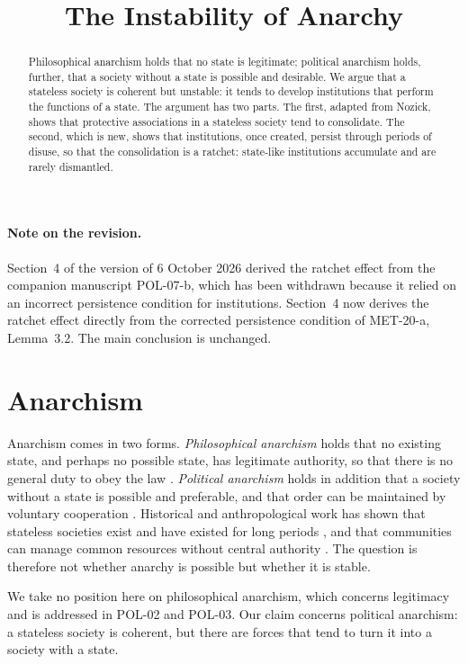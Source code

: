\documentclass{situationist-preprint}
\title{The Instability of Anarchy}
\begin{document}
\maketitle

\begin{abstract}
Philosophical anarchism holds that no state is legitimate; political anarchism holds, further, that a society without a state is possible and desirable. We argue that a stateless society is coherent but unstable: it tends to develop institutions that perform the functions of a state. The argument has two parts. The first, adapted from Nozick, shows that protective associations in a stateless society tend to consolidate. The second, which is new, shows that institutions, once created, persist through periods of disuse, so that the consolidation is a ratchet: state-like institutions accumulate and are rarely dismantled.
\end{abstract}

\paragraph{Note on the revision.} Section~4 of the version of 6 October 2026 derived the ratchet effect from the companion manuscript POL-07-b, which has been withdrawn because it relied on an incorrect persistence condition for institutions. Section~4 now derives the ratchet effect directly from the corrected persistence condition of MET-20-a, Lemma~3.2. The main conclusion is unchanged.

\section{Anarchism}

Anarchism comes in two forms. \emph{Philosophical anarchism} holds that no existing state, and perhaps no possible state, has legitimate authority, so that there is no general duty to obey the law \citep{Wolff1970}. \emph{Political anarchism} holds in addition that a society without a state is possible and preferable, and that order can be maintained by voluntary cooperation \citep{Taylor1982}. Historical and anthropological work has shown that stateless societies exist and have existed for long periods \citep{Scott2009}, and that communities can manage common resources without central authority \citep{Ostrom1990}. The question is therefore not whether anarchy is possible but whether it is stable.

We take no position here on philosophical anarchism, which concerns legitimacy and is addressed in POL-02 and POL-03. Our claim concerns political anarchism: a stateless society is coherent, but there are forces that tend to turn it into a society with a state.
\end{document}
